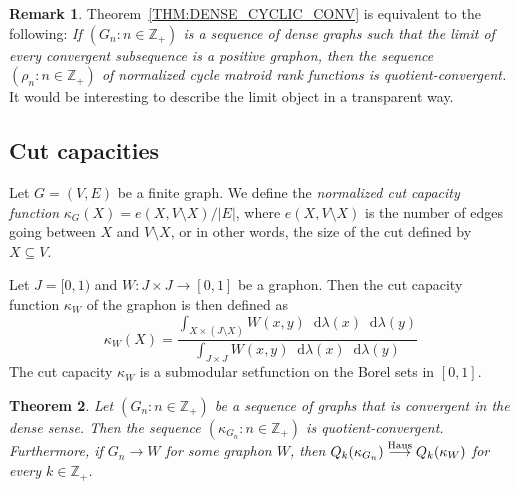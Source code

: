 \documentclass[10pt]{article}
\theoremstyle{plain}
\newtheorem{thm}{Theorem}[section]
\theoremstyle{definition}
\newtheorem{rem}[thm]{Remark}
\newcommand*\diff{\mathop{}\!\mathrm{d}}
\newcommand{\bbZ}{\mathbb{Z}}
\newcommand{\Haus}{{\text{\rm Haus}}}
\newcommand{\hto}{\stackrel{\Haus}{\longrightarrow}}
\begin{document}
\begin{rem}
Theorem~\ref{THM:DENSE_CYCLIC_CONV} is equivalent to the following: {\it If $(G_n\colon n\in\bbZ_+)$ is a sequence of dense graphs such that the limit of every convergent subsequence is a positive graphon, then the sequence $(\rho_n\colon n\in\bbZ_+)$ of normalized cycle matroid rank functions is quotient-convergent.} It would be interesting to describe the limit object in a transparent way.
\end{rem}

\subsection{Cut capacities}\label{SSEC:GRAPHON-CUT}
\label{sec:cut}

Let $G=(V,E)$ be a finite graph. We define the {\it normalized cut capacity function} $\kappa_G(X)=e(X,V\setminus X)/|E|$, where $e(X,V\setminus X)$ is the number of
edges going between $X$ and $V\setminus X$, or in other words, the size of the cut defined by $X\subseteq V$.

Let $J=[0,1)$ and $W\colon J\times J\to [0,1]$ be a graphon. Then the cut capacity function $\kappa_W$ of the graphon is then defined as
\[
\kappa_W(X) = \frac{\int_{X\times (J\setminus X)}W(x,y)\diff\lambda(x)\diff\lambda(y)}{\int_{J\times J}W(x,y)\diff\lambda(x)\diff\lambda(y)}
\]
The cut capacity $\kappa_W$ is a submodular setfunction on the Borel sets in $[0,1]$.

\begin{thm}\label{THM:SK-QK}
Let $(G_n\colon n\in\bbZ_+)$ be a sequence of graphs that is convergent in the dense
sense. Then the sequence $(\kappa_{G_n}\colon n\in\bbZ_+)$ is quotient-convergent.
Furthermore, if $G_n\to W$ for some graphon $W$, then $Q_k(\kappa_{G_n})\hto
Q_k(\kappa_W)$ for every $k\in\bbZ_+$.
\end{thm}
\end{document}
